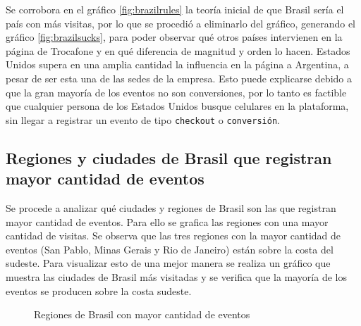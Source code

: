\documentclass[a4paper]{article}
\begin{document}
Se corrobora en el gráfico \ref{fig:brazilrules} la teoría inicial de que Brasil sería el país con más visitas, por lo que se procedió a eliminarlo del gráfico, generando el gráfico \ref{fig:brazilsucks}, para poder observar qué otros países intervienen en la página de Trocafone y en qué diferencia de magnitud y orden lo hacen. Estados Unidos supera en una amplia cantidad la influencia en la página a Argentina, a pesar de ser esta una de las sedes de la empresa. Esto puede explicarse debido a que la gran mayoría de los eventos no son conversiones, por lo tanto es factible que cualquier persona de los Estados Unidos busque celulares en la plataforma, sin llegar a registrar un evento de tipo \texttt{checkout} o \texttt{conversión}.

\subsection{Regiones y ciudades de Brasil que registran mayor cantidad de eventos}

Se procede a analizar qué ciudades y regiones de Brasil son las que registran mayor cantidad de eventos. Para ello se grafica las regiones con una mayor cantidad de visitas. Se observa que las tres regiones con la mayor cantidad de eventos (San Pablo, Minas Gerais y Rio de Janeiro) están sobre la costa del sudeste. Para visualizar esto de una mejor manera se realiza un gráfico que muestra las ciudades de Brasil más visitadas y se verifica que la mayoría de los eventos se producen sobre la costa sudeste.

\begin{figure}[h!]
	\caption{Regiones de Brasil con mayor cantidad de eventos}
	\label{fig:regionsbrasil}
\end{figure}
\end{document}
